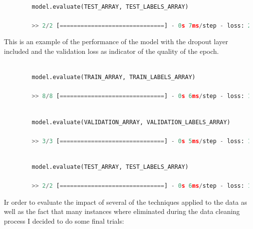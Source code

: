 \documentclass[12pt, a4paper]{article}
\begin{document}
	\vspace{5mm}
	
	\begin{lstlisting}[language=Python]
		
		model.evaluate(TEST_ARRAY, TEST_LABELS_ARRAY)
		
		>> 2/2 [==============================] - 0s 7ms/step - loss: 2.1517 - categorical_accuracy: 0.3390 - accuracy: 0.0085
	\end{lstlisting}
	\vspace{5mm}
	
	This is an example of the performance of the model with the dropout layer included and the validation loss as indicator of the quality of the epoch.
	
	\vspace{5mm}
	\begin{lstlisting}[language=Python]
		
		model.evaluate(TRAIN_ARRAY, TRAIN_LABELS_ARRAY)
		
		>> 8/8 [==============================] - 0s 6ms/step - loss: 1.0641 - categorical_accuracy: 0.3992 - accuracy: 0.0000e+00
	\end{lstlisting}
	
	\vspace{5mm}
	
	\begin{lstlisting}[language=Python]
		
		model.evaluate(VALIDATION_ARRAY, VALIDATION_LABELS_ARRAY)
		
		>> 3/3 [==============================] - 0s 5ms/step - loss: 1.0902 - categorical_accuracy: 0.3378 - accuracy: 0.0000e+00
	\end{lstlisting}

	\vspace{5mm}
	
	\begin{lstlisting}[language=Python]
		
		model.evaluate(TEST_ARRAY, TEST_LABELS_ARRAY)
		
		>> 2/2 [==============================] - 0s 6ms/step - loss: 1.9819 - categorical_accuracy: 0.3390 - accuracy: 0.0085
	\end{lstlisting}
	
	\vspace{5mm}
	
	Ir order to evaluate the impact of several of the techniques applied to the data as well as the fact that many instances where eliminated during the data cleaning process I decided to do some final trials:
	
\end{document}
